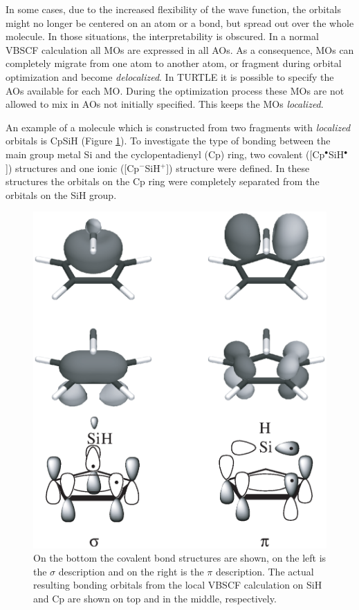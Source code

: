 In some cases, due to the increased flexibility of the wave function, the orbitals might no longer be centered on an atom or a bond, but spread out over the whole molecule. In those situations, the interpretability is obscured. In a normal VBSCF calculation all MOs are expressed in all AOs. As a consequence, MOs can completely migrate from one atom to another atom, or fragment during orbital optimization and become \textit{delocalized}. In TURTLE it is possible to specify the AOs available for each MO. During the optimization process these MOs are not allowed to mix in AOs not initially specified. This keeps the MOs \textit{localized}. 

An example of a molecule which is constructed from two fragments with \textit{localized} orbitals is CpSiH (Figure \ref{ch1.fig7}). To investigate the type of bonding between the main group metal Si and the cyclopentadienyl (Cp) ring, two covalent ([Cp$^\bullet$SiH$^\bullet$]) structures and one ionic ([Cp$^{-}$SiH$^{+}$]) structure were defined. In these structures the orbitals on the Cp ring were completely separated from the orbitals on the SiH group.
\begin{figure}[htbp]
\center
\includegraphics[scale=0.5]{introduction/figures/figure7.eps}
\caption{On the bottom the covalent bond structures are shown, on the left is the $\sigma$ description and on the right is the $\pi$ description. The actual resulting bonding orbitals from the local VBSCF calculation on SiH and Cp are shown on top and in the middle, respectively.}
\label{ch1.fig7}
\end{figure}
